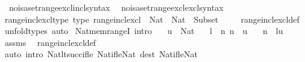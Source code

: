 \begin{isabellebody}
\ \ no{\isacharunderscore}{\kern0pt}isa{\isacharunderscore}{\kern0pt}set{\isacharunderscore}{\kern0pt}range{\isacharunderscore}{\kern0pt}excl{\isacharunderscore}{\kern0pt}incl{\isacharunderscore}{\kern0pt}syntax\isanewline
\ \ no{\isacharunderscore}{\kern0pt}isa{\isacharunderscore}{\kern0pt}set{\isacharunderscore}{\kern0pt}range{\isacharunderscore}{\kern0pt}excl{\isacharunderscore}{\kern0pt}excl{\isacharunderscore}{\kern0pt}syntax\isanewline
{}\isamarkupfalse%
\isanewline
\isanewline
{}\isamarkupfalse%
\ range{\isacharunderscore}{\kern0pt}incl{\isacharunderscore}{\kern0pt}excl{\isacharunderscore}{\kern0pt}type\ {\isacharbrackleft}{\kern0pt}type{\isacharbrackright}{\kern0pt}{\isacharcolon}{\kern0pt}\ {\isachardoublequoteopen}range{\isacharunderscore}{\kern0pt}incl{\isacharunderscore}{\kern0pt}excl\ {\isacharcolon}{\kern0pt}\ Nat\ {\isasymRightarrow}\ Nat\ {\isasymRightarrow}\ Subset\ {\isasymnat}{\isachardoublequoteclose}\isanewline
%
\isadelimproof
\ \ %
\endisadelimproof
%
\isatagproof
{}\isamarkupfalse%
\ range{\isacharunderscore}{\kern0pt}incl{\isacharunderscore}{\kern0pt}excl{\isacharunderscore}{\kern0pt}def\ \isamarkupfalse%
\ unfold{\isacharunderscore}{\kern0pt}types\ auto%
\endisatagproof
{\isafoldproof}%
%
\isadelimproof
\isanewline
%
\endisadelimproof
\isanewline
{}\isamarkupfalse%
\ Nat{\isacharunderscore}{\kern0pt}mem{\isacharunderscore}{\kern0pt}rangeI\ {\isacharbrackleft}{\kern0pt}intro{\isacharbrackright}{\kern0pt}{\isacharcolon}{\kern0pt}\isanewline
\ \ \ {\isachardoublequoteopen}u\ {\isacharcolon}{\kern0pt}\ Nat{\isachardoublequoteclose}\isanewline
\ \ \ {\isachardoublequoteopen}l\ {\isasymle}\ n{\isachardoublequoteclose}\ {\isachardoublequoteopen}n\ {\isasymle}\ u{\isachardoublequoteclose}\isanewline
\ \ \ {\isachardoublequoteopen}n\ {\isasymin}\ {\isacharbrackleft}{\kern0pt}l{\isacharcomma}{\kern0pt}{\isasymdots}{\isacharcomma}{\kern0pt}u{\isacharbrackright}{\kern0pt}{\isachardoublequoteclose}\isanewline
%
\isadelimproof
\ \ %
\endisadelimproof
%
\isatagproof
{}\isamarkupfalse%
\ assms\ \isamarkupfalse%
\ range{\isacharunderscore}{\kern0pt}incl{\isacharunderscore}{\kern0pt}excl{\isacharunderscore}{\kern0pt}def\isanewline
\ \ \isamarkupfalse%
\ {\isacharparenleft}{\kern0pt}auto\ intro{\isacharcolon}{\kern0pt}\ Nat{\isacharunderscore}{\kern0pt}lt{\isacharunderscore}{\kern0pt}succ{\isacharunderscore}{\kern0pt}if{\isacharunderscore}{\kern0pt}le\ Nat{\isacharunderscore}{\kern0pt}if{\isacharunderscore}{\kern0pt}le{\isacharunderscore}{\kern0pt}Nat\ dest{\isacharcolon}{\kern0pt}\ Nat{\isacharunderscore}{\kern0pt}if{\isacharunderscore}{\kern0pt}le{\isacharunderscore}{\kern0pt}Nat{\isacharparenright}{\kern0pt}%

\end{isabellebody}
